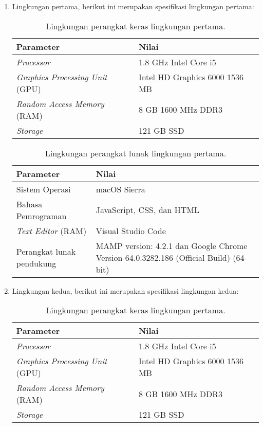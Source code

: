 \begin{enumerate}
	\item Lingkungan pertama, berikut ini merupakan spesifikasi lingkungan pertama:
		\begin{table}[h!]
		\centering
		\begin{tabular}{|| m{16em} | m{20em} ||} 
 		\hline
		{\bf Parameter} & {\bf Nilai} \\ [0.5ex] 
 		\hline\hline
		{\it Processor} & 1.8 GHz Intel Core i5 \\ 
		\hline
		{\it Graphics Processing Unit} (GPU) & Intel HD Graphics 6000 1536 MB  \\ 
		\hline
		{\it Random Access Memory} (RAM) & 8 GB 1600 MHz DDR3 \\ 
		\hline
		{\it Storage} & 121 GB SSD \\ [1ex] 
 		\hline
		\end{tabular}
		\caption{Lingkungan perangkat keras lingkungan pertama.}
		\label{table:1}
		\end{table}
		
		\begin{table}[h!]
		\centering
		\begin{tabular}{|| m{16em} | m{20em} ||} 
 		\hline
		{\bf Parameter} & {\bf Nilai} \\ [0.5ex] 
 		\hline\hline
		Sistem Operasi & macOS Sierra \\ 
		\hline
		Bahasa Pemrograman & JavaScript, CSS, dan HTML  \\ 
		\hline
		{\it Text Editor} (RAM) & Visual Studio Code \\ 
 		\hline
		Perangkat lunak pendukung & MAMP version: 4.2.1 dan Google Chrome Version 64.0.3282.186 (Official Build) (64-bit) \\ [1ex] 
 		\hline
		\end{tabular}
		\caption{Lingkungan perangkat lunak lingkungan pertama.}
		\label{table:1}
		\end{table}
		
	\item Lingkungan kedua, berikut ini merupakan spesifikasi lingkungan kedua:
		\begin{table}[h!]
		\centering
		\begin{tabular}{|| m{16em} | m{20em} ||} 
 		\hline
		{\bf Parameter} & {\bf Nilai} \\ [0.5ex] 
 		\hline\hline
		{\it Processor} & 1.8 GHz Intel Core i5 \\ 
		\hline
		{\it Graphics Processing Unit} (GPU) & Intel HD Graphics 6000 1536 MB  \\ 
		\hline
		{\it Random Access Memory} (RAM) & 8 GB 1600 MHz DDR3 \\ 
		\hline
		{\it Storage} & 121 GB SSD \\ [1ex] 
 		\hline
		\end{tabular}
		\caption{Lingkungan perangkat keras lingkungan pertama.}
		\label{table:1}
		\end{table}
		

\end{enumerate}
